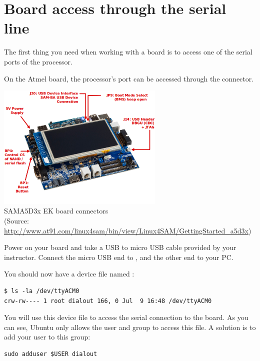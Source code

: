 
\section{Board access through the serial line}

The first thing you need when working with a board is to access one of
the serial ports of the processor.

On the Atmel board, the processor's  port can be accessed
through the  connector.

\begin{center}
\includegraphics[width=8cm]{labs/boottime-getting-started/a5d3x_board_presentation.png}
\\
SAMA5D3x EK board connectors \\
{\small
(Source:
\url{http://www.at91.com/linux4sam/bin/view/Linux4SAM/GettingStarted_a5d3x})}
\end{center}

Power on your board and take a USB to micro USB cable provided by your
instructor. Connect the micro USB end to , and the other end
to your PC.  

You should now have a device file named :

\begin{verbatim}
$ ls -la /dev/ttyACM0 
crw-rw---- 1 root dialout 166, 0 Jul  9 16:48 /dev/ttyACM0
\end{verbatim}

You will use this device file to access the serial connection to the board.
As you can see, Ubuntu only allows the  user and
 group to access this file. A solution is to add your user 
to this  group:

\begin{verbatim}
sudo adduser $USER dialout
\end{verbatim}

